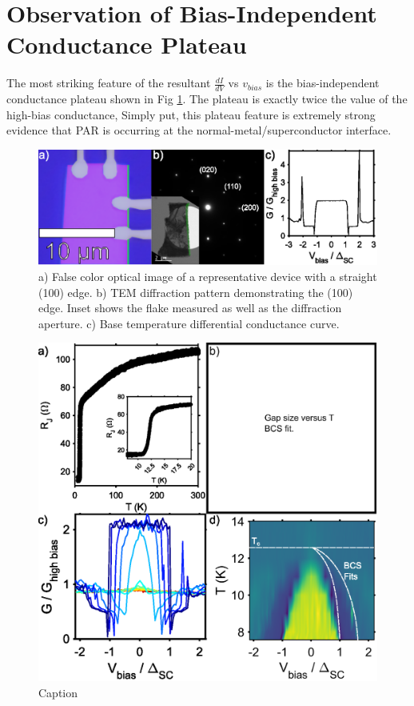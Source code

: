 \section{Observation of Bias-Independent Conductance Plateau}
The most striking feature of the resultant $\frac{dI}{dV}$ vs $v_{bias}$ is the bias-independent conductance plateau shown in Fig \ref{fig:PARDeviceFab}. The plateau is exactly twice the value of the high-bias conductance, Simply put, this plateau feature is extremely strong evidence that \ac{PAR} is occurring at the normal-metal/superconductor interface. 
\begin{figure}
    \centering
    \includegraphics[width = \textwidth]{Chap4/Figures/DeviceFab.eps}
    \caption{a) False color optical image of a representative device with a straight (100) edge. b) \ac{TEM} diffraction pattern demonstrating the (100) edge. Inset shows the flake measured as well as the diffraction aperture. c) Base temperature differential conductance curve.}
    \label{fig:PARDeviceFab}
\end{figure}
\begin{figure}
    \centering
    \includegraphics[width = \textwidth]{Chap4/Figures/Temperature.eps}
    \caption{Caption}
    \label{fig:PARTemp}
\end{figure}
